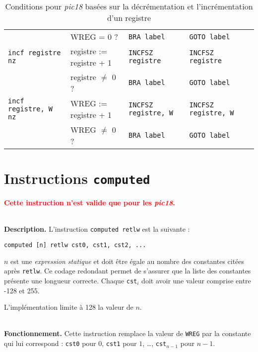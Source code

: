 \begin{table}[!ht]
\begin{tabular}{lllll}
    \rowcolor{\fondTableau}                           & WREG = 0 ?           &\texttt{BRA label}           & \texttt{GOTO label}\\
                           \texttt{incf registre nz}  & registre := registre + 1    &\texttt{INCFSZ registre}  & \texttt{INCFSZ registre}\\
                                                      & registre $\ne$ 0 ?              &\texttt{BRA label}        & \texttt{GOTO label}\\
    \rowcolor{\fondTableau}\texttt{incf registre, W nz}& WREG := registre + 1 &\texttt{INCFSZ registre, W}  & \texttt{INCFSZ registre, W}\\
    \rowcolor{\fondTableau}                           & WREG $\ne$ 0 ?           &\texttt{BRA label}           & \texttt{GOTO label}\\
    \hline
  \end{tabular}
  \caption{Conditions pour \emph{pic18} basées sur la décrémentation et l'incrémentation d'un registre}
\end{table}







\section{Instructions \texttt{computed}}


\textcolor{red}{\bf Cette instruction n'est valide que pour les \emph{pic18}.}

~\\
\textbf{Description.} L'instruction \texttt{computed retlw} est la suivante :
\begin{lstlisting}[language=piccolo]
computed [n] retlw cst0, cst1, cst2, ...
\end{lstlisting}

$n$ est une \emph{expression statique} et doit être égale au nombre des constantes citées après \texttt{retlw}. Ce codage redondant permet de s'assurer que la liste des constantes présente une longueur correcte. Chaque \texttt{cst$_i$} doit avoir une valeur comprise entre -128 et 255.

L'implémentation limite à 128 la valeur de $n$.

~\\
\textbf{Fonctionnement.} Cette instruction remplace la valeur de \texttt{WREG} par la constante qui lui correspond : \texttt{cst0} pour $0$, \texttt{cst1} pour $1$, …, \texttt{cst$_{n-1}$} pour $n-1$. 

